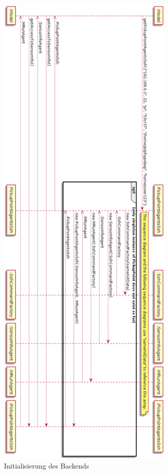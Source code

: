 \documentclass[parskip=full]{scrartcl}
\begin{document}
\begin{figure}[htbp]
	\begin{center}
		\includegraphics[width = 8.5cm]{Grafiken/1-InitialisierungBackend_Rotated.png}
		\caption{Initialisierung des Backends}
		\label{InitBackend}
	\end{center}
\end{figure}
\end{document}
